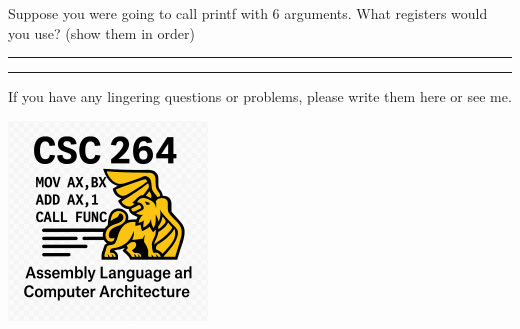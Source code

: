 \documentclass[letterpaper,12pt]{exam}
\begin{document}
\begin{questions}
\begin{samepage}
    \question Suppose you were going to call printf with 6 arguments.  What registers would you use?  (show them in order)
    \vspace{5mm}
\end{samepage}
\par
   
\rule{0.5\textwidth}{.4pt} %





\end{questions} 
\begin{center}
    \rule{0.667\textwidth}{.8pt} %
\end{center}


If you have any lingering questions or problems, please write them here or see me.
\vfill
\begin{center}
\includegraphics{../csc264Logo}
\end{center}
\end{document}
